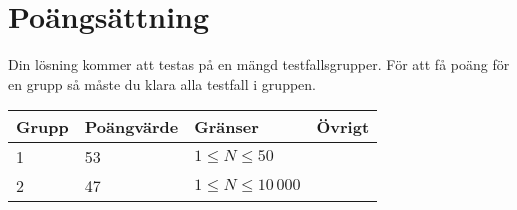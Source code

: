 \section*{Poängsättning}
Din lösning kommer att testas på en mängd testfallsgrupper. För att få poäng för en grupp
så måste du klara alla testfall i gruppen.

\begin{tabular}{| l | l | l | l |}
\hline
Grupp & Poängvärde & Gränser & Övrigt \\ \hline
1     & 53         &  $1 \le N \le 50$ & \\ \hline
2     & 47         &  $1 \le N \le 10\,000$ & \\ \hline
\end{tabular}
